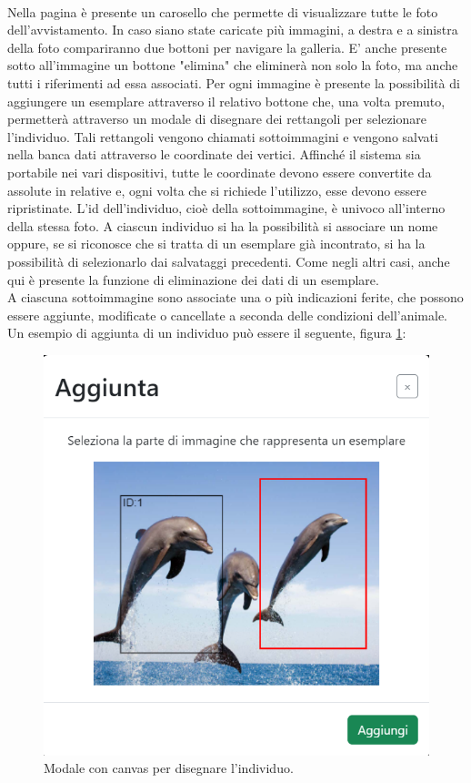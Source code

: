 \documentclass[a4paper,final,12pt]{report}
\begin{document}
\\Nella pagina è presente un carosello che permette di visualizzare tutte le foto dell'avvistamento. In caso siano state caricate più immagini, a destra e a sinistra della foto compariranno due bottoni per navigare la galleria. E' anche presente sotto all'immagine  un bottone "elimina" che eliminerà non solo la foto, ma anche tutti i riferimenti ad essa associati.
Per ogni immagine è presente la possibilità di aggiungere un esemplare attraverso il relativo bottone che, una volta premuto, permetterà attraverso un modale di disegnare dei rettangoli per selezionare l'individuo. Tali rettangoli vengono chiamati sottoimmagini e vengono salvati nella banca dati attraverso le coordinate dei vertici. Affinché il sistema sia portabile nei vari dispositivi, tutte le coordinate devono essere convertite da assolute in relative e, ogni volta che si richiede l'utilizzo, esse devono essere ripristinate. L'id dell'individuo, cioè della sottoimmagine, è univoco all'interno della stessa foto. A ciascun individuo si ha la possibilità si associare un nome oppure, se si riconosce che si tratta di un esemplare già incontrato, si ha la possibilità di selezionarlo dai salvataggi precedenti. Come negli altri casi, anche qui è presente la funzione di eliminazione dei dati di un esemplare.\\
A ciascuna sottoimmagine sono associate una o più  indicazioni ferite, che possono essere aggiunte, modificate o cancellate a seconda delle condizioni dell'animale.
Un esempio di aggiunta di un individuo può essere il seguente, figura \ref{figura:aggmodavvallso}:
\begin{figure}[hbtp]
\centering
\includegraphics[scale=0.80]{img_concettuale/addEsempl.png}
\caption{Modale con canvas per disegnare l'individuo.}
\label{figura:aggmodavvallso}
\end{figure}
\end{document}
